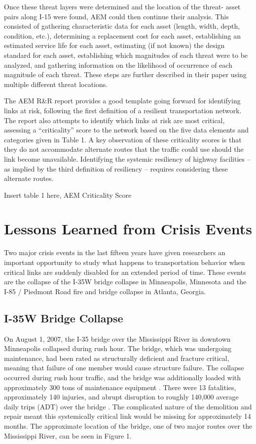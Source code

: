 Once these threat layers were determined and the location of the threat-
asset pairs along I-15
were found, AEM could then continue their analysis. This consisted of
gathering characteristic
data for each asset (length, width, depth, condition, etc.), determining a
replacement cost for
each asset, establishing an estimated service life for each asset,
estimating (if not known) the
design standard for each asset, establishing which magnitudes of each
threat were to be analyzed,
and gathering information on the likelihood of occurrence of each
magnitude of each threat. These
steps are further described in their paper using multiple different threat
locations.

The AEM R\&R report provides a good template going forward for identifying
links at risk,
following the first definition of a resilient transportation network. The
report also attempts to
identify which links at risk are most critical, assessing a “criticality”
score to the network
based on the five data elements and categories given in Table 1. A key
observation of these
criticality scores is that they do not accommodate alternate routes that
the traffic could use
should the link become unavailable. Identifying the systemic resiliency of
highway facilities
– as implied by the third definition of resiliency – requires considering
these alternate routes.

Insert table 1 here, AEM Criticality Score

\section{Lessons Learned from Crisis Events}

Two major crisis events in the last fifteen years have given researchers
an important opportunity
to study what happens to transportation behavior when critical links are
suddenly disabled for an
extended period of time. These events are the collapse of the I-35W bridge
collapse in
Minneapolis, Minnesota and the I-85 / Piedmont Road fire and bridge
collapse in Atlanta, Georgia.

\subsection{I-35W Bridge Collapse}

On August 1, 2007, the I-35 bridge over the Mississippi River in downtown
Minneapolis collapsed
during rush hour. The bridge, which was undergoing maintenance, had been
rated as structurally
deficient and fracture critical, meaning that failure of one member would
cause structure
failure. The collapse occurred during rush hour traffic, and the bridge
was additionally loaded
with approximately 300 tons of maintenance equipment \cite{schaper2017}.
There were 13
fatalities,
approximately 140 injuries, and abrupt disruption to roughly 140,000
average daily trips (ADT)
over the bridge \cite{zhu2010}. The complicated nature of the demolition
and repair meant
this systemically critical link would be missing for approximately 14
months. The approximate
location of the bridge, one of two major routes over the Mississippi
River, can be seen in Figure
1.

